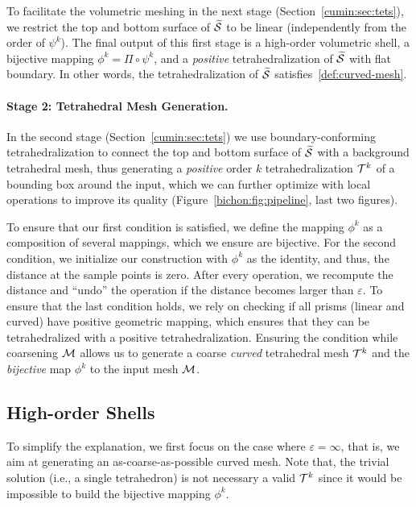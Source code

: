To facilitate the volumetric meshing in the next stage (Section~\ref{cumin:sec:tets}), we restrict the top and bottom surface of $\widetilde{\mathcal{S}}$ to be linear (independently from the order of $\psi^k$). The final output of this first stage is a high-order volumetric shell,
a bijective mapping $\phi^k = \Pi \circ \psi^k$,
and a \emph{positive} tetrahedralization of $\widetilde{\mathcal{S}}$ with flat boundary. In other words, the tetrahedralization of $\widetilde{\mathcal{S}}$ satisfies~\ref{def:curved-mesh}.

\paragraph{Stage 2: Tetrahedral Mesh Generation.}
In the second stage (Section~\ref{cumin:sec:tets}) we use boundary-conforming tetrahedralization to connect the top and bottom surface of $\widetilde{\mathcal{S}}$ with a background tetrahedral mesh, thus generating a \emph{positive} order $k$ tetrahedralization $\mathcal{T}^k$ of a bounding box around the input, which we can further optimize with local operations to improve its quality  (Figure~\ref{bichon:fig:pipeline}, last two figures). %


To ensure that our first condition is satisfied{,} we define the mapping $\phi^k$ as a composition of several mappings{,} which we ensure are bijective. 
For the second condition, we initialize our construction with $\phi^k$ {as} the identity, {and} thus, the distance at the sample points is zero. 
After every operation, we recompute the distance and ``undo'' the operation if the distance becomes larger than $\varepsilon$. To ensure that the last condition holds, we rely on checking if all prisms (linear and curved) have positive geometric mapping, which {ensures} that they can be tetrahedralized with a positive tetrahedralization. 
Ensuring the condition while coarsening $\mathcal{M}$ {allows} us to generate a coarse \emph{curved} tetrahedral mesh $\mathcal{T}^k$ and the \emph{bijective} map $\phi^k$ to the input mesh $\mathcal{M}$.


\subsection{High-order Shells}\label{cumin:sec:high-order}
To simplify the explanation, we first focus on the case where $\varepsilon = \infty$, that is, we aim at generating {an} as-coarse-as-possible curved mesh. Note that, the trivial solution (i.e., a single tetrahedron) is not necessary a valid $\mathcal{T}^k$ since it would be impossible to build the bijective mapping $\phi^k$.

